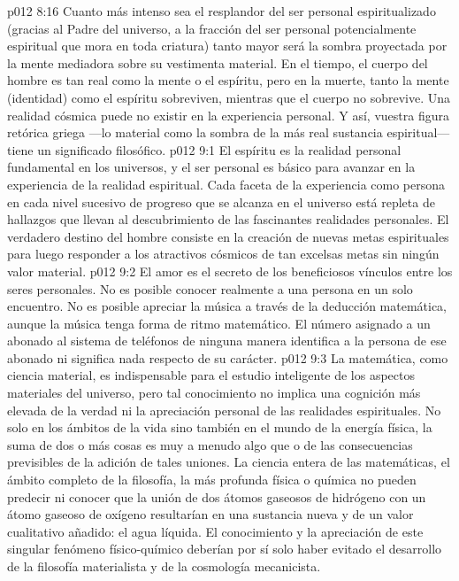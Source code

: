 \vs p012 8:16 Cuanto más intenso sea el resplandor del ser personal espiritualizado (gracias al Padre del universo, a la fracción del ser personal potencialmente espiritual que mora en toda criatura) tanto mayor será la sombra proyectada por la mente mediadora sobre su vestimenta material. En el tiempo, el cuerpo del hombre es tan real como la mente o el espíritu, pero en la muerte, tanto la mente (identidad) como el espíritu sobreviven, mientras que el cuerpo no sobrevive. Una realidad cósmica puede no existir en la experiencia personal. Y así, vuestra figura retórica griega ---lo material como la sombra de la más real sustancia espiritual--- tiene un significado filosófico.
\vs p012 9:1 El espíritu es la realidad personal fundamental en los universos, y el ser personal es básico para avanzar en la experiencia de la realidad espiritual. Cada faceta de la experiencia como persona en cada nivel sucesivo de progreso que se alcanza en el universo está repleta de hallazgos que llevan al descubrimiento de las fascinantes realidades personales. El verdadero destino del hombre consiste en la creación de nuevas metas espirituales para luego responder a los atractivos cósmicos de tan excelsas metas sin ningún valor material.
\vs p012 9:2 \pc El amor es el secreto de los beneficiosos vínculos entre los seres personales. No es posible conocer realmente a una persona en un solo encuentro. No es posible apreciar la música a través de la deducción matemática, aunque la música tenga forma de ritmo matemático. El número asignado a un abonado al sistema de teléfonos de ninguna manera identifica a la persona de ese abonado ni significa nada respecto de su carácter.
\vs p012 9:3 La matemática, como ciencia material, es indispensable para el estudio inteligente de los aspectos materiales del universo, pero tal conocimiento no implica una cognición más elevada de la verdad ni la apreciación personal de las realidades espirituales. No solo en los ámbitos de la vida sino también en el mundo de la energía física, la suma de dos o más cosas es muy a menudo algo  que o  de las consecuencias previsibles de la adición de tales uniones. La ciencia entera de las matemáticas, el ámbito completo de la filosofía, la más profunda física o química no pueden predecir ni conocer que la unión de dos átomos gaseosos de hidrógeno con un átomo gaseoso de oxígeno resultarían en una sustancia nueva y de un valor cualitativo añadido: el agua líquida. El conocimiento y la apreciación de este singular fenómeno físico\hyp{}químico deberían por sí solo haber evitado el desarrollo de la filosofía materialista y de la cosmología mecanicista.
